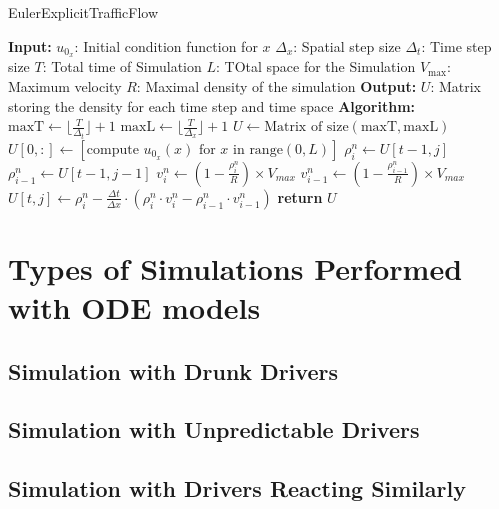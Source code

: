 \documentclass{article}
\begin{document}
		\begin{algorithm}[H]
			\caption{EulerExplicitTrafficFlow}\label{alg:euler_traffic_flow}
			\begin{algorithmic}
				\State \textbf{Input:}
				\State $u_{0_x}$: Initial condition function for $x$
				\State $\Delta_x$: Spatial step size
				\State $\Delta_t$: Time step size
				\State $T$: Total time of Simulation
				\State $L$: TOtal space for the Simulation
				\State $V_{\text{max}}$: Maximum velocity
				\State $R$: Maximal density of the simulation
				\State \textbf{Output:}
				\State $U$: Matrix storing the density for each time step and time space 
				\State \textbf{Algorithm:}
				\State $\text{maxT} \gets \lfloor  \frac{T}{\Delta_t} \rfloor  + 1$ \newline
				\State $\text{maxL} \gets \lfloor  \frac{T}{\Delta_x} \rfloor  + 1$ \newline
				\State $U \gets \text{Matrix of size}(\text{maxT}, \text{maxL})$
				\State $U[0, :] \gets \left[ \text{compute } u_{0_x}(x) \text{ for } x \text{ in } \text{range}(0, L) \right]$
				\State $\rho_i^n \gets U[t-1, j]$
				\State $\rho_{i-1}^n \gets U[t-1, j-1]$
				\State $v_i^n \gets \left( 1 - \frac{\rho_i^n}{R}\right)  \times V_{max}$ \newline
				\State $v_{i-1}^n \gets \left( 1 - \frac{\rho_{i-1}^n}{R}\right)  \times V_{max}$
				\State $U[t, j] \gets \rho_i^n - \frac{\Delta t}{\Delta x} \cdot \left(\rho_i^n \cdot v_i^n - \rho_{i-1}^n \cdot v_{i-1}^n\right)$
				\EndFor
				\EndFor
				\State \textbf{return} $U$
			\end{algorithmic}
		\end{algorithm}

		
		
	
	\section{Types of Simulations Performed with ODE models}
		\subsection{Simulation with Drunk Drivers}
		\subsection{Simulation with Unpredictable Drivers}
		\subsection{Simulation with Drivers Reacting Similarly}
\end{document}
